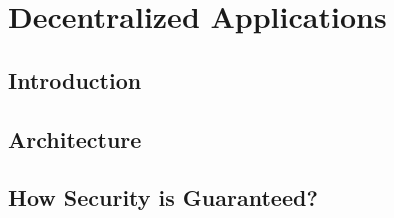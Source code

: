 \section{Decentralized Applications}\label{sec::decentralizedapps}

\subsection{Introduction}

\subsection{Architecture}

\subsection{How Security is Guaranteed?}